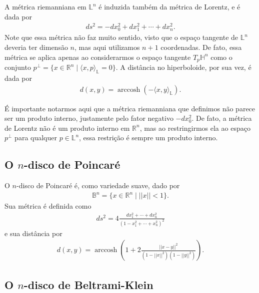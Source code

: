 \documentclass{article}
\DeclareMathOperator{\arccosh}{arccosh}
\begin{document}
A métrica riemanniana em $\mathbb{L}^n$ é induzida também da métrica de Lorentz, e é dada por \begin{align}
    ds^2 = -dx_0^2 + dx_1^2 + \cdots + dx_n^2.
\end{align} Note que essa métrica não faz muito sentido, visto que o espaço tangente de $\mathbb{L}^n$ deveria ter dimensão $n$, mas aqui utilizamos $n+1$ coordenadas. De fato, essa métrica se aplica apenas ao considerarmos o espaço tangente $T_p\mathbb{H}^n$ como o conjunto $p^\perp = \{x \in \mathbb{R}^n \mid \langle x, p \rangle_\mathbb{L} = 0\}$. A distância no hiperboloide, por sua vez, é dada por \begin{align}
    d(x,y) = \arccosh(-\langle x, y \rangle_\mathbb{L}).
\end{align}

É importante notarmos aqui que a métrica riemanniana que definimos não parece ser um produto interno, justamente pelo fator negativo $-dx_0^2$. De fato, a métrica de Lorentz não é um produto interno em $\mathbb{R}^n$, mas ao restringirmos ela ao espaço $p^\perp$ para qualquer $p \in \mathbb{L}^n$, essa restrição é sempre um produto interno.

\subsection{O \texorpdfstring{$n$}{n}-disco de Poincaré}

O $n$-disco de Poincaré é, como variedade suave, dado por \begin{align}
    \mathbb{B}^n = \{x \in \mathbb{R}^n \mid ||x|| < 1\}.
\end{align} Sua métrica é definida como \begin{align}
    ds^2 = 4\frac{dx_1^2 + \cdots + dx_n^2}{(1 - x_1^2 + \cdots + x_n^2)^2}
\end{align} e sua distância por \begin{align}
    d(x,y) = \arccosh\left(1 + 2\frac{||x - y||^2}{(1 - ||x||^2)(1 - ||y||^2)}\right).
\end{align}

\subsection{O \texorpdfstring{$n$}{n}-disco de Beltrami-Klein}
\end{document}
